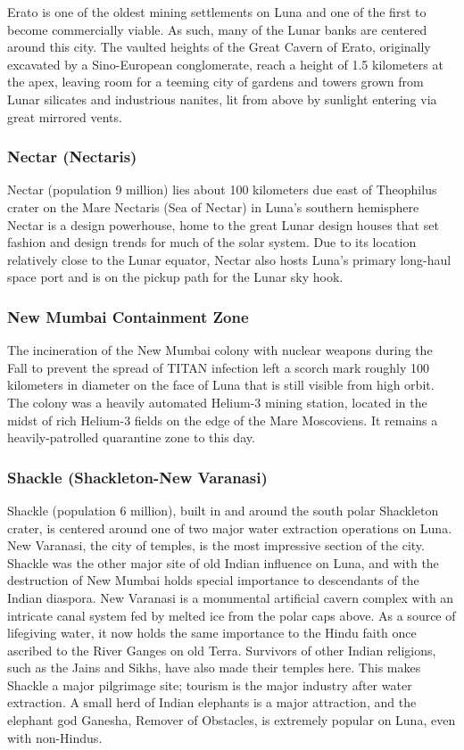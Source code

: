 Erato is one of the oldest mining settlements on 
Luna and one of the first to become commercially 
viable. As such, many of the Lunar banks are centered 
around this city. The vaulted heights of the Great 
Cavern of Erato, originally excavated by a Sino-European
conglomerate, reach a height of 1.5 kilometers at
the apex, leaving room for a teeming city of gardens 
and towers grown from Lunar silicates and industrious
nanites, lit from above by sunlight entering via
great mirrored vents.

\subsubsection{Nectar (Nectaris)}

Nectar (population 9 million) lies about 100 kilometers
due east of Theophilus crater on the Mare
Nectaris (Sea of Nectar) in Luna's southern hemisphere
Nectar is a design powerhouse, home to the
great Lunar design houses that set fashion and design 
trends for much of the solar system. Due to its location
relatively close to the Lunar equator, Nectar also
hosts Luna's primary long-haul space port and is on 
the pickup path for the Lunar sky hook.

\subsubsection{New Mumbai Containment Zone}

The incineration of the New Mumbai colony with 
nuclear weapons during the Fall to prevent the spread 
of TITAN infection left a scorch mark roughly 100 
kilometers in diameter on the face of Luna that is 
still visible from high orbit. The colony was a heavily 
automated Helium-3 mining station, located in the 
midst of rich Helium-3 fields on the edge of the Mare 
Moscoviens. It remains a heavily-patrolled quarantine 
zone to this day.

\subsubsection{Shackle (Shackleton-New Varanasi)}

Shackle (population 6 million), built in and around 
the south polar Shackleton crater, is centered around 
one of two major water extraction operations on 
Luna. New Varanasi, the city of temples, is the most 
impressive section of the city. Shackle was the other 
major site of old Indian influence on Luna, and with 
the destruction of New Mumbai holds special importance
to descendants of the Indian diaspora. New
Varanasi is a monumental artificial cavern complex 
with an intricate canal system fed by melted ice from 
the polar caps above. As a source of lifegiving water, 
it now holds the same importance to the Hindu faith 
once ascribed to the River Ganges on old Terra. Survivors
of other Indian religions, such as the Jains and
Sikhs, have also made their temples here. This makes 
Shackle a major pilgrimage site; tourism is the major 
industry after water extraction. A small herd of Indian 
elephants is a major attraction, and the elephant god 
Ganesha, Remover of Obstacles, is extremely popular 
on Luna, even with non-Hindus.

